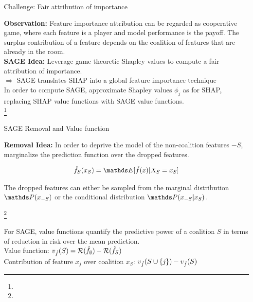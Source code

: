 \documentclass[11pt,compress,t,notes=noshow, aspectratio=169, xcolor=table]{beamer}
\begin{document}
\begin{frame}{Challenge: Fair attribution of importance}

\textbf{Observation:} Feature importance attribution can be regarded as cooperative game, where each feature is a player and model performance is the payoff. The surplus contribution of a feature depends on the coalition of features that are already in the room.\\
\lz
\textbf{SAGE Idea:} Leverage game-theoretic Shapley values to compute a fair attribution of importance.\\
\lz
$\Rightarrow$ SAGE translates SHAP into a global feature importance technique\\
\lz
In order to compute SAGE, approximate Shapley values $\phi_j$ as for SHAP, replacing SHAP value functions with SAGE value functions.\\

\footnote[frame]{}
  
\end{frame}


\begin{frame}{SAGE Removal and Value function}
  
 \textbf{Removal Idea:} In order to deprive the model of the non-coalition features $-S$, marginalize the prediction function over the dropped features.

$$\fh_S(x_S) = \E[\fh(x) | X_S = x_S]$$
  
The dropped features can either be sampled from the marginal distribution $\P(x_{-S})$ or the conditional distribution $\P(x_{-S}|x_S)$.\\
\lz

\footnote[frame]{}

For SAGE, value functions quantify the predictive power of a coalition $S$ in terms of reduction in risk over the mean prediction.\\
\lz
Value function:  $ v_{\fh}(S) = \risk(\fh_{\emptyset}) - \risk(\fh_{S})$\\
\lz
Contribution of feature $x_j$ over coalition $x_S$:  $v_{\fh}(S \cup \{j\}) - v_{\fh}(S)$\\
\lz

\end{frame}
\end{document}
